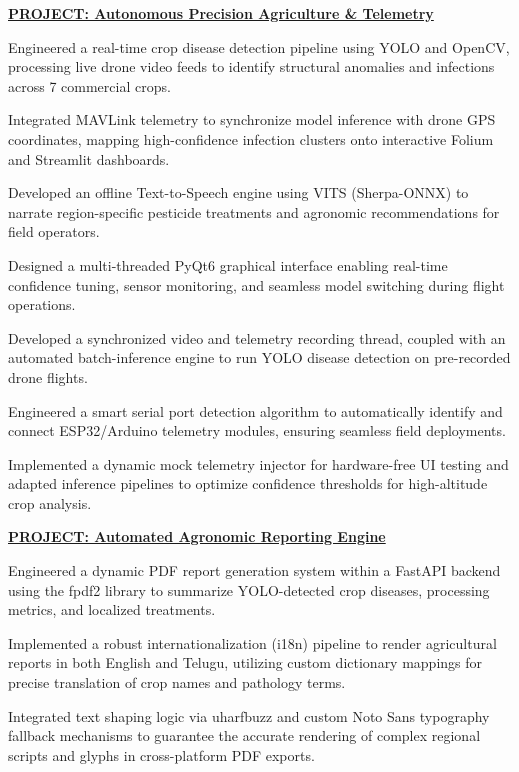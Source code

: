 \documentclass[letterpaper,11pt]{article}
\newcommand{\resumeItem}[1]{
  \item\small{
    {#1 \vspace{-2pt}}
  }
}
\begin{document}
        \vspace{2pt}
        \resumeItem{\textbf{\underline{PROJECT: Autonomous Precision Agriculture \& Telemetry}}}
        \resumeItem{Engineered a real-time crop disease detection pipeline using YOLO and OpenCV, processing live drone video feeds to identify structural anomalies and infections across 7 commercial crops.}
        \resumeItem{Integrated MAVLink telemetry to synchronize model inference with drone GPS coordinates, mapping high-confidence infection clusters onto interactive Folium and Streamlit dashboards.}
        \resumeItem{Developed an offline Text-to-Speech engine using VITS (Sherpa-ONNX) to narrate region-specific pesticide treatments and agronomic recommendations for field operators.}
        \resumeItem{Designed a multi-threaded PyQt6 graphical interface enabling real-time confidence tuning, sensor monitoring, and seamless model switching during flight operations.}
        \resumeItem{Developed a synchronized video and telemetry recording thread, coupled with an automated batch-inference engine to run YOLO disease detection on pre-recorded drone flights.}
        \resumeItem{Engineered a smart serial port detection algorithm to automatically identify and connect ESP32/Arduino telemetry modules, ensuring seamless field deployments.}
        \resumeItem{Implemented a dynamic mock telemetry injector for hardware-free UI testing and adapted inference pipelines to optimize confidence thresholds for high-altitude crop analysis.}

        \vspace{4pt}
        \resumeItem{\textbf{\underline{PROJECT: Automated Agronomic Reporting Engine}}}
        \resumeItem{Engineered a dynamic PDF report generation system within a FastAPI backend using the fpdf2 library to summarize YOLO-detected crop diseases, processing metrics, and localized treatments.}
        \resumeItem{Implemented a robust internationalization (i18n) pipeline to render agricultural reports in both English and Telugu, utilizing custom dictionary mappings for precise translation of crop names and pathology terms.}
        \resumeItem{Integrated text shaping logic via uharfbuzz and custom Noto Sans typography fallback mechanisms to guarantee the accurate rendering of complex regional scripts and glyphs in cross-platform PDF exports.}
\end{document}
